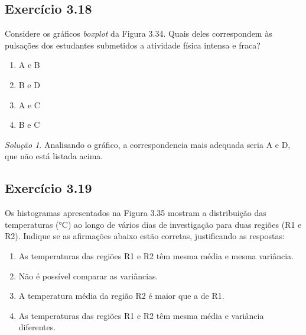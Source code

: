 \documentclass[
]{latex/krantz}
\providecommand{\tightlist}{%
  \setlength{\itemsep}{0pt}\setlength{\parskip}{0pt}}
\theoremstyle{definition}
\theoremstyle{definition}
\theoremstyle{definition}
\theoremstyle{definition}
\theoremstyle{remark}
\newtheorem*{solution}{Solução}
\begin{document}
\hypertarget{exr3-18}{%
\subsection*{Exercício 3.18}\label{exr3-18}}

Considere os gráficos \emph{boxplot} da Figura 3.34. Quais deles correspondem às pulsações dos estudantes submetidos a atividade física intensa e fraca?

\begin{enumerate}
\def\labelenumi{\alph{enumi})}
\tightlist
\item
  A e B
\item
  B e D
\item
  A e C
\item
  B e C
\end{enumerate}

\begin{solution}
Analisando o gráfico, a correspondencia mais adequada seria A e D, que não está listada acima.
\end{solution}

\hypertarget{exr3-19}{%
\subsection*{Exercício 3.19}\label{exr3-19}}

Os histogramas apresentados na Figura 3.35 mostram a distribuição das temperaturas (°C) ao longo de vários dias de investigação para duas regiões (R1 e R2). Indique se as afirmações abaixo estão corretas, justificando as respostas:

\begin{enumerate}
\def\labelenumi{\alph{enumi})}
\tightlist
\item
  As temperaturas das regiões R1 e R2 têm mesma média e mesma variância.
\item
  Não é possível comparar as variâncias.
\item
  A temperatura média da região R2 é maior que a de R1.
\item
  As temperaturas das regiões R1 e R2 têm mesma média e variância diferentes.
\end{enumerate}
\end{document}
